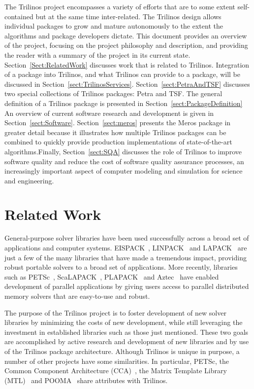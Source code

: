 \documentclass[acmtoms,acmnow]{acmtrans2m}
\begin{document}
The Trilinos project encompasses a variety of efforts that are to some
extent self-contained but at the same time inter-related.  The
Trilinos design allows individual packages to grow and mature
autonomously to the extent the algorithms and package developers
dictate.  This document provides an overview of the project,
focusing on the project philosophy and description, and
providing the reader with a summary of the project in its current
state. 
Section~\ref{Sect:RelatedWork} discusses work that is related to Trilinos. 
Integration of a package into Trilinos, and what Trilinos can provide
to a package, will be discussed in Section~\ref{sect:TrilinosServices}.
Section~\ref{sect:PetraAndTSF} discusses two special collections of Trilinos
packages: Petra and TSF.  The general definition of a Trilinos
package is presented in Section~\ref{sect:PackageDefinition}
An overview of current software research and
development is given in Section~\ref{sect:Software}. 
Section~\ref{sect:meros} presents the Meros package in greater detail
because it illustrates how multiple Trilinos packages can be combined 
to quickly provide production implementations of state-of-the-art 
algorithms.Finally, Section~\ref{sect:SQA} discusses the role of 
Trilinos to improve software quality and reduce the cost of software 
quality assurance processes, an increasingly important aspect
of computer modeling and simulation for science and engineering.  

\section{Related Work}

General-purpose solver libraries have been used successfully across 
a broad set of applications and computer systems.  EISPACK~\cite{eispack}, 
LINPACK~\cite{linpack} and LAPACK~\cite{lapack} are just a few of
the many libraries that have made a tremendous impact, providing robust 
portable solvers to a broad set of applications.  More recently, libraries 
such as PETSc~\cite{petsc-home-page,petsc-manual,petsc-efficient}, 
ScaLAPACK~\cite{scalapack}, PLAPACK~\cite{plapack} 
and Aztec~\cite{Aztec2.1} have enabled development of parallel
applications by giving users access to parallel distributed 
memory solvers that are easy-to-use and robust.

The purpose of the Trilinos project is to foster development
of new solver libraries by minimizing the costs of new development,
while still leveraging the investment in
established libraries such as those just mentioned.  These two goals
are accomplished by active research and development of new libraries
and by use of the Trilinos package architecture.  Although
Trilinos is unique in purpose, a number of other projects have some 
similarities.  In particular, PETSc, the Common Component Architecture
(CCA)~\cite{CCA-home-page}, the Matrix
Template Library (MTL)~\cite{MTL-home-page} and POOMA~\cite{POOMA}
share attributes with Trilinos.
\end{document}
